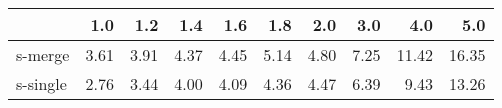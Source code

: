 \begin{tabular}{lrrrrrrrrr}
\toprule
{} &  1.0 &  1.2 &  1.4 &  1.6 &  1.8 &  2.0 &  3.0 &   4.0 &   5.0 \\
\midrule
s-merge  & 3.61 & 3.91 & 4.37 & 4.45 & 5.14 & 4.80 & 7.25 & 11.42 & 16.35 \\
s-single & 2.76 & 3.44 & 4.00 & 4.09 & 4.36 & 4.47 & 6.39 &  9.43 & 13.26 \\
\bottomrule
\end{tabular}
